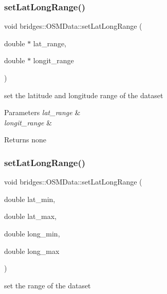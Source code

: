 \subsubsection{\texorpdfstring{setLatLongRange()}{setLatLongRange()}\hspace{0.1cm}{\footnotesize\ttfamily [1/2]}}
{\footnotesize\ttfamily void bridges\+::\+O\+S\+M\+Data\+::set\+Lat\+Long\+Range (\begin{DoxyParamCaption}\item[{double $\ast$}]{lat\+\_\+range,  }\item[{double $\ast$}]{longit\+\_\+range }\end{DoxyParamCaption})\hspace{0.3cm}{\ttfamily [inline]}}

set the latitude and longitude range of the dataset


\begin{DoxyParams}{Parameters}
{\em lat\+\_\+range} & \\
\hline
{\em longit\+\_\+range} & \\
\hline
\end{DoxyParams}
\begin{DoxyReturn}{Returns}
none 
\end{DoxyReturn}
\mbox{\label{classbridges_1_1_o_s_m_data_a4ddb01d0735da5e21fd8e33d1d5203ad}} 
\subsubsection{\texorpdfstring{setLatLongRange()}{setLatLongRange()}\hspace{0.1cm}{\footnotesize\ttfamily [2/2]}}
{\footnotesize\ttfamily void bridges\+::\+O\+S\+M\+Data\+::set\+Lat\+Long\+Range (\begin{DoxyParamCaption}\item[{double}]{lat\+\_\+min,  }\item[{double}]{lat\+\_\+max,  }\item[{double}]{long\+\_\+min,  }\item[{double}]{long\+\_\+max }\end{DoxyParamCaption})\hspace{0.3cm}{\ttfamily [inline]}}

set the range of the dataset


